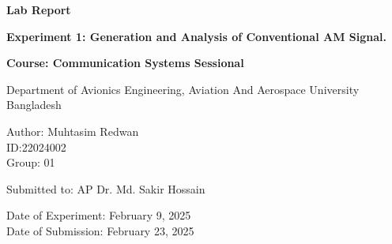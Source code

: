 \begin{titlepage}
    \centering
    
    \Huge
    \textbf{Lab Report}
    
    \vspace{0.5in}
    \LARGE
    \textbf{Experiment 1: Generation and Analysis of Conventional AM Signal.}
    
    \vspace{1in}
    
    \textbf{Course: Communication Systems Sessional}

    \vspace{1in}
    
    Department of Avionics Engineering, Aviation And Aerospace University Bangladesh\\
    
    \vspace{0.5in}
    
    Author: Muhtasim Redwan \\
    ID:22024002\\
    Group: 01\\
    
    \vspace{0.5in}
    
    Submitted to: AP Dr. Md. Sakir Hossain \\
    
    \vfill
    
    \Large
    Date of Experiment: February 9, 2025\\
    Date of Submission: February 23, 2025\\
    
\end{titlepage}